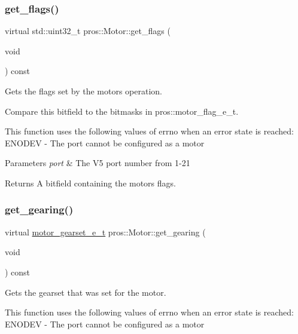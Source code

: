 \subsubsection{\texorpdfstring{get\+\_\+flags()}{get\_flags()}}
{\footnotesize\ttfamily virtual std\+::uint32\+\_\+t pros\+::\+Motor\+::get\+\_\+flags (\begin{DoxyParamCaption}\item[{void}]{ }\end{DoxyParamCaption}) const\hspace{0.3cm}{\ttfamily [virtual]}}



Gets the flags set by the motor\textquotesingle{}s operation. 

Compare this bitfield to the bitmasks in pros\+::motor\+\_\+flag\+\_\+e\+\_\+t.

This function uses the following values of errno when an error state is reached\+: E\+N\+O\+D\+EV -\/ The port cannot be configured as a motor


\begin{DoxyParams}{Parameters}
{\em port} & The V5 port number from 1-\/21\\
\hline
\end{DoxyParams}
\begin{DoxyReturn}{Returns}
A bitfield containing the motor\textquotesingle{}s flags. 
\end{DoxyReturn}
\mbox{\label{classpros_1_1Motor_a3227bc4fbe531638472fff4dfb134333}} 
\subsubsection{\texorpdfstring{get\+\_\+gearing()}{get\_gearing()}}
{\footnotesize\ttfamily virtual \hyperlink{motors_8h_aa2f1c305c998abc3bf8dd1f76fa4da8b}{motor\+\_\+gearset\+\_\+e\+\_\+t} pros\+::\+Motor\+::get\+\_\+gearing (\begin{DoxyParamCaption}\item[{void}]{ }\end{DoxyParamCaption}) const\hspace{0.3cm}{\ttfamily [virtual]}}



Gets the gearset that was set for the motor. 

This function uses the following values of errno when an error state is reached\+: E\+N\+O\+D\+EV -\/ The port cannot be configured as a motor

